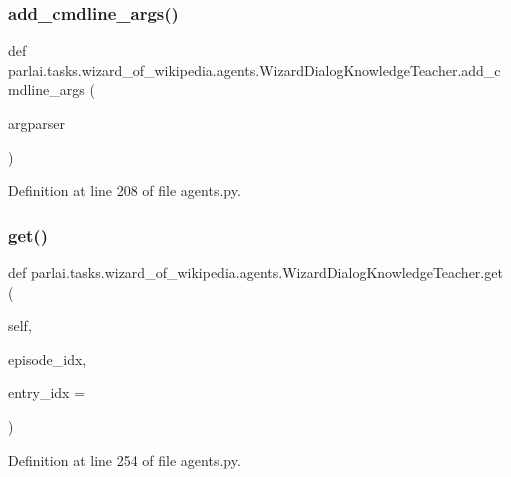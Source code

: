 \subsubsection{\texorpdfstring{add\+\_\+cmdline\+\_\+args()}{add\_cmdline\_args()}}
{\footnotesize\ttfamily def parlai.\+tasks.\+wizard\+\_\+of\+\_\+wikipedia.\+agents.\+Wizard\+Dialog\+Knowledge\+Teacher.\+add\+\_\+cmdline\+\_\+args (\begin{DoxyParamCaption}\item[{}]{argparser }\end{DoxyParamCaption})\hspace{0.3cm}{\ttfamily [static]}}



Definition at line 208 of file agents.\+py.

\mbox{\label{classparlai_1_1tasks_1_1wizard__of__wikipedia_1_1agents_1_1WizardDialogKnowledgeTeacher_afb8212ad3cf99ccf6507eacef747f9d4}} 
\subsubsection{\texorpdfstring{get()}{get()}}
{\footnotesize\ttfamily def parlai.\+tasks.\+wizard\+\_\+of\+\_\+wikipedia.\+agents.\+Wizard\+Dialog\+Knowledge\+Teacher.\+get (\begin{DoxyParamCaption}\item[{}]{self,  }\item[{}]{episode\+\_\+idx,  }\item[{}]{entry\+\_\+idx = {} }\end{DoxyParamCaption})}



Definition at line 254 of file agents.\+py.



